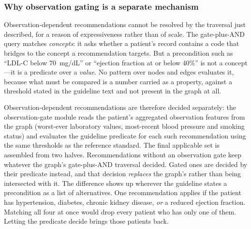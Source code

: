 \subsubsection*{Why observation gating is a separate mechanism}
Observation-dependent recommendations cannot be resolved by the traversal just described, for
a reason of expressiveness rather than of scale. The gate-plus-AND query matches
\emph{concepts}: it asks whether a patient's record contains a code that bridges to the
concept a recommendation targets. But a precondition such as ``LDL-C below 70~mg/dL'' or
``ejection fraction at or below 40\%'' is not a concept---it is a predicate over a
\emph{value}. No pattern over nodes and edges evaluates it, because what must be compared is
a number carried as a property, against a threshold stated in the guideline text and not
present in the graph at all.

Observation-dependent recommendations are therefore decided separately: the observation-gate
module reads the patient's aggregated observation features from the graph (worst-ever
laboratory values, most-recent blood pressure and smoking status) and evaluates the guideline
predicate for each such recommendation using the same thresholds as the reference standard.
The final applicable set is assembled from two halves. Recommendations without an
observation gate keep whatever the graph's gate-plus-AND traversal decided. Gated ones are
decided by their predicate instead, and that decision \emph{replaces} the graph's rather than
being intersected with it. The difference shows up wherever the guideline states a precondition
as a list of alternatives. One recommendation applies if the patient has hypertension, diabetes, chronic kidney
disease, \emph{or} a reduced ejection fraction. Matching all four at once would drop every
patient who has only one of them. Letting the predicate decide brings those patients back.

